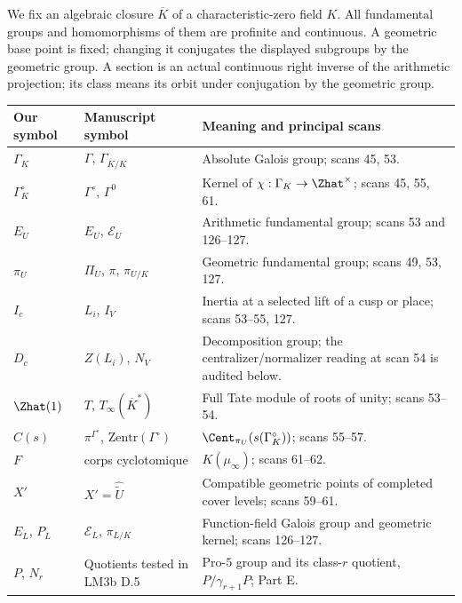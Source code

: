 We fix an algebraic closure $\overline K$ of a characteristic-zero field $K$. All fundamental groups and homomorphisms of them are profinite and continuous. A geometric base point is fixed; changing it conjugates the displayed subgroups by the geometric group. A section is an actual continuous right inverse of the arithmetic projection; its class means its orbit under conjugation by the geometric group.

\small
\begin{longtable}{>{\raggedright\arraybackslash}p{}>{\raggedright\arraybackslash}p{}>{\raggedright\arraybackslash}p{}}
\toprule Our symbol & Manuscript symbol & Meaning and principal scans\\\midrule\endhead
$\Gamma_K$ & $\Gamma$, $\Gamma_{\overline K/K}$ & Absolute Galois group; scans 45, 53.\\
$\Gamma_K^\circ$ & $\Gamma^\circ$, $\Gamma^0$ & Kernel of $\chi:\Gamma_K\to\Zhat^\times$; scans 45, 55, 61.\\
$E_U$ & $E_U$, $\mathcal E_U$ & Arithmetic fundamental group; scans 53 and 126--127.\\
$\pi_U$ & $\Pi_U$, $\pi$, $\pi_{U/K}$ & Geometric fundamental group; scans 49, 53, 127.\\
$I_c$ & $L_i$, $I_V$ & Inertia at a selected lift of a cusp or place; scans 53--55, 127.\\
$D_c$ & $Z(L_i)$, $N_V$ & Decomposition group; the centralizer/normalizer reading at scan 54 is audited below.\\
$\Zhat(1)$ & $T$, $T_\infty(\overline K^*)$ & Full Tate module of roots of unity; scans 53--54.\\
$C(s)$ & $\pi^{\Gamma^\circ}$, $\mathrm{Zentr}(\Gamma^\circ)$ & $\Cent_{\pi_U}(s(\Gamma_K^\circ))$; scans 55--57.\\
$F$ & corps cyclotomique & $K(\mu_\infty)$; scans 61--62.\\
$X'$ & $X'=\widehat{\widetilde U}$ & Compatible geometric points of completed cover levels; scans 59--61.\\
$E_L$, $P_L$ & $\mathcal E_L$, $\pi_{L/K}$ & Function-field Galois group and geometric kernel; scans 126--127.\\
$P$, $N_r$ & Quotients tested in LM3b D.5 & Pro-$5$ group and its class-$r$ quotient, $P/\gamma_{r+1}P$; Part E.\\
\bottomrule
\end{longtable}
\normalsize
